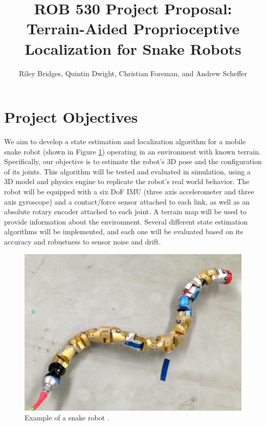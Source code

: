 \documentclass[letterpaper, 10 pt, conference]{ieeeconf}  %
\title{\LARGE \bf
ROB 530 Project Proposal: \\ Terrain-Aided Proprioceptive Localization for Snake Robots
}
\author{Riley Bridges, Quintin Dwight, Christian Foreman, and Andrew Scheffer%
}
\begin{document}
\maketitle
\thispagestyle{empty}
\pagestyle{empty}




\section{Project Objectives}
We aim to develop a state estimation and localization algorithm for a mobile snake robot (shown in Figure \ref{fig:snake_robot}) operating in an environment with known terrain. Specifically, our objective is to estimate the robot's 3D pose and the configuration of its joints. This algorithm will be tested and evaluated in simulation, using a 3D model and physics engine to replicate the robot's real world behavior. The robot will be equipped with a six DoF IMU (three axis accelerometer and three axis gyroscope) and a contact/force sensor attached to each link, as well as an absolute rotary encoder attached to each joint. A terrain map will be used to provide information about the environment. Several different state estimation algorithms will be implemented, and each one will be evaluated based on its accuracy and robustness to sensor noise and drift.

\begin{figure}[h]
    \centering
    \includegraphics[width=0.7\linewidth]{snake_robot.png}
    \caption{Example of a snake robot \cite{c1}.}
    \label{fig:snake_robot}
\end{figure}
\end{document}
